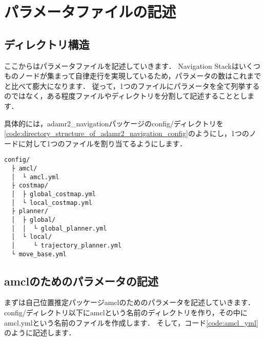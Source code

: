 \documentclass[{../../master}]{subfiles}
\begin{document}
\section{パラメータファイルの記述}

\subsection{ディレクトリ構造}

ここからはパラメータファイルを記述していきます．
Navigation Stackはいくつものノードが集まって自律走行を実現しているため，パラメータの数はこれまでと比べて膨大になります．
従って，1つのファイルにパラメータを全て列挙するのではなく，ある程度ファイルやディレクトリを分割して記述することとします．

具体的には，\textsf{adamr2\_navigation}パッケージの\textsf{config/}ディレクトリを\ref{code:directory_structure_of_adamr2_navigation_config}のようにし，1つのノードに対して1つのファイルを割り当てるようにします．

\begin{lstlisting}[caption=Directory Structure of \textsf{config/}, label=code:directory_structure_of_adamr2_navigation_config]
config/
  ├ amcl/
  │  └ amcl.yml
  ├ costmap/
  │  ├ global_costmap.yml
  │  └ local_costmap.yml
  ├ planner/
  │  ├ global/
  │  │  └ global_planner.yml
  │  └ local/
  │     └ trajectory_planner.yml
  └ move_base.yml
\end{lstlisting}

\subsection{\textsf{amcl}のためのパラメータの記述}

まずは自己位置推定パッケージ\textsf{amcl}のためのパラメータを記述していきます．
\textsf{config/}ディレクトリ以下に\textsf{amcl}という名前のディレクトリを作り，その中に\textsf{amcl.yml}という名前のファイルを作成します．
そして，コード\ref{code:amcl_yml}のように記述します．
\end{document}
